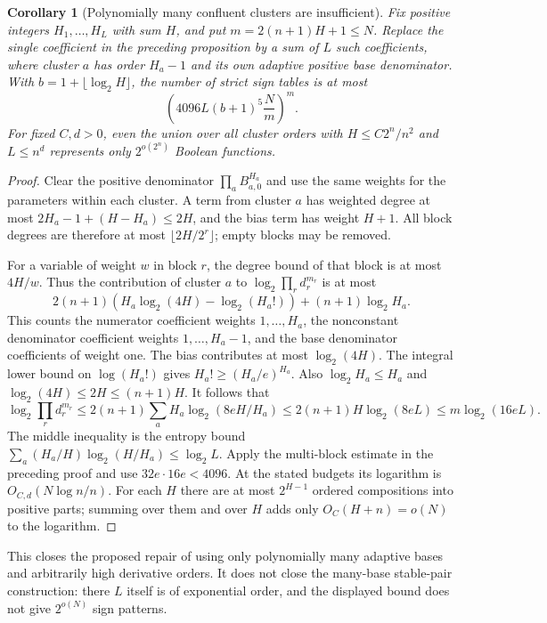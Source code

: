 \documentclass[11pt]{article}
\newtheorem{corollary}[proposition]{Corollary}
\begin{document}
\begin{corollary}[Polynomially many confluent clusters are insufficient]
Fix positive integers $H_1,\ldots,H_L$ with sum $H$, and put
$m=2(n+1)H+1\le N$. Replace the single coefficient in the preceding
proposition by a sum of $L$ such coefficients, where cluster $a$
has order $H_a-1$ and its own adaptive positive base denominator.
With $b=1+\lfloor\log_2H\rfloor$, the number of strict sign tables
is at most
\[
 \left(4096L(b+1)^5\frac Nm\right)^m.
\]
For fixed $C,d>0$, even the union over all cluster orders with
$H\le C2^n/n^2$ and $L\le n^d$ represents only $2^{o(2^n)}$
Boolean functions.
\end{corollary}
\begin{proof}
Clear the positive denominator $\prod_a B_{a,0}^{H_a}$ and use
the same weights for the parameters within each cluster. A term
from cluster $a$ has weighted degree at most
$2H_a-1+(H-H_a)\le2H$, and the bias term has weight $H+1$.
All block degrees are therefore at most
$\lfloor2H/2^r\rfloor$; empty blocks may be removed.

For a variable of weight $w$ in block $r$, the degree bound of that
block is at most $4H/w$. Thus the contribution of cluster $a$ to
$\log_2\prod_r d_r^{m_r}$ is at most
\[
 2(n+1)\left(H_a\log_2(4H)-\log_2(H_a!)\right)
 +(n+1)\log_2H_a.
\]
This counts the numerator coefficient weights $1,\ldots,H_a$,
the nonconstant denominator coefficient weights $1,\ldots,H_a-1$,
and the base denominator coefficients of weight one. The bias
contributes at most $\log_2(4H)$.
The integral lower bound on $\log(H_a!)$ gives
$H_a!\ge(H_a/e)^{H_a}$. Also
$\log_2H_a\le H_a$ and $\log_2(4H)\le2H\le(n+1)H$.
It follows that
\[
 \log_2\prod_r d_r^{m_r}
 \le2(n+1)\sum_a H_a\log_2(8eH/H_a)
 \le2(n+1)H\log_2(8eL)
 \le m\log_2(16eL).
\]
The middle inequality is the entropy bound
$\sum_a(H_a/H)\log_2(H/H_a)\le\log_2L$.
Apply the multi-block estimate in the preceding proof and use
$32e\cdot16e<4096$.
At the stated budgets its logarithm is $O_{C,d}(N\log n/n)$.
For each $H$ there are at most $2^{H-1}$ ordered compositions
into positive parts; summing over them and over $H$ adds only
$O_C(H+n)=o(N)$ to the logarithm.
\end{proof}

This closes the proposed repair of using only polynomially many
adaptive bases and arbitrarily high derivative orders. It does not
close the many-base stable-pair construction: there $L$ itself is
of exponential order, and the displayed bound does not give
$2^{o(N)}$ sign patterns.
\end{document}

